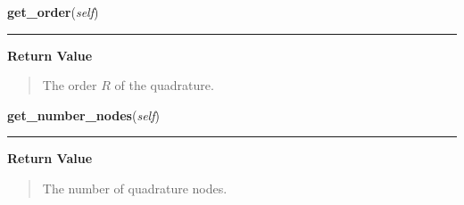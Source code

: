     \label{Quadrator:Quadrator:get_order}

    \vspace{0.5ex}

\hspace{.8\funcindent}\begin{boxedminipage}{\funcwidth}

    \raggedright \textbf{get\_order}(\textit{self})

    \vspace{-1.5ex}

    \rule{\textwidth}{0.5\fboxrule}
\setlength{\parskip}{2ex}
\setlength{\parskip}{1ex}
      \textbf{Return Value}
    \vspace{-1ex}

      \begin{quote}
      The order $R$ of the quadrature.

      \end{quote}

    \end{boxedminipage}

    \label{Quadrator:Quadrator:get_number_nodes}

    \vspace{0.5ex}

\hspace{.8\funcindent}\begin{boxedminipage}{\funcwidth}

    \raggedright \textbf{get\_number\_nodes}(\textit{self})

    \vspace{-1.5ex}

    \rule{\textwidth}{0.5\fboxrule}
\setlength{\parskip}{2ex}
\setlength{\parskip}{1ex}
      \textbf{Return Value}
    \vspace{-1ex}

      \begin{quote}
      The number of quadrature nodes.

      \end{quote}

    \end{boxedminipage}

    \label{Quadrator:Quadrator:get_nodes}

